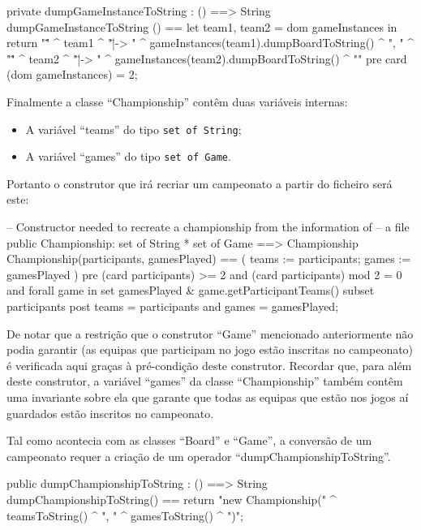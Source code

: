 \begin{vdm_al}
  private dumpGameInstanceToString : () ==> String
  dumpGameInstanceToString () ==
    let {team1, team2} = dom gameInstances in
    return "{\"" ^ team1 ^ "\" |-> " ^ gameInstances(team1).dumpBoardToString() ^ ", "
      ^ "\"" ^ team2 ^ "\" |-> " ^ gameInstances(team2).dumpBoardToString() ^ "}"
  pre card (dom gameInstances) = 2;
\end{vdm_al}

Finalmente a classe ``Championship'' contêm duas variáveis internas:

\begin{itemize}
\item A variável ``teams'' do tipo \texttt{set of String};
\item A variável ``games'' do tipo \texttt{set of Game}.
\end{itemize}

Portanto o construtor que irá recriar um campeonato a partir do
ficheiro será este:

\begin{vdm_al}
  -- Constructor needed to recreate a championship from the information of
  -- a file
  public Championship: set of String * set of Game ==> Championship
  Championship(participants, gamesPlayed) == (
    teams := participants;
    games := gamesPlayed
  )
  pre (card participants) >= 2 and (card participants) mod 2 = 0 and
    forall game in set gamesPlayed & game.getParticipantTeams() subset participants
  post teams = participants and games = gamesPlayed;
\end{vdm_al}

De notar que a restrição que o construtor ``Game'' mencionado
anteriormente não podia garantir (as equipas que participam no jogo
estão inscritas no campeonato) é verificada aqui graças à pré-condição
deste construtor. Recordar que, para além deste construtor, a variável
``games'' da classe ``Championship'' também contêm uma invariante
sobre ela que garante que todas as equipas que estão nos jogos aí
guardados estão inscritos no campeonato.

Tal como acontecia com as classes ``Board'' e ``Game'', a conversão de
um campeonato requer a criação de um operador
``dumpChampionshipToString''.


\begin{vdm_al}
  public dumpChampionshipToString : () ==> String
  dumpChampionshipToString() ==
    return "new Championship(" ^ teamsToString() ^ ", " ^ gamesToString() ^ ")";
\end{vdm_al}

